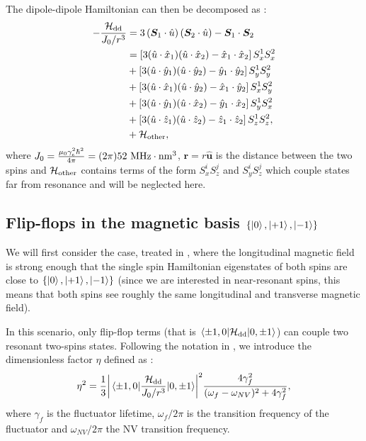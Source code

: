 \documentclass[preprintnumbers,amsmath,amssymb,onecolumn,12pt]{revtex4-2}\usepackage{graphicx}%
\begin{document}
The dipole-dipole Hamiltonian can then be decomposed as :
\begin{align}
-\frac{\mathcal{H}_{\rm dd}}{J_0/r^3}&= 3\left({\bm S}_1 \cdot \hat{u} \right)\left({\bm S}_2 \cdot \hat{u} \right) - {\bm S}_1 \cdot {\bm S}_2  \\
&=\left[3(\hat{u}\cdot\hat{x}_1)(\hat{u}\cdot\hat{x}_2) -\hat{x}_1\cdot\hat{x}_2\right] S_x^1S_x^2 \\
&+\left[3(\hat{u}\cdot\hat{y}_1)(\hat{u}\cdot\hat{y}_2) -\hat{y}_1\cdot\hat{y}_2\right] S_y^1S_y^2 \\
&+\left[3(\hat{u}\cdot\hat{x}_1)(\hat{u}\cdot\hat{y}_2) -\hat{x}_1\cdot\hat{y}_2\right] S_x^1S_y^2 \\
&+\left[3(\hat{u}\cdot\hat{y}_1)(\hat{u}\cdot\hat{x}_2) -\hat{y}_1\cdot\hat{x}_2\right] S_y^1S_x^2 \\
&+\left[3(\hat{u}\cdot\hat{z}_1)(\hat{u}\cdot\hat{z}_2) -\hat{z}_1\cdot\hat{z}_2\right] S_z^1S_z^2, \\
&+\mathcal{H}_{\rm other},
\end{align}
where $J_0=\frac{\mu_0 \gamma_e^2 \hbar^2}{4 \pi} = (2 \pi) 52\ \rm MHz \cdot \rm{nm}^3$, $\bm r= r\bm{\hat u}$ is the distance between the two spins and  $\mathcal{H}_{\rm other}$ contains terms of the form $S_x^iS_z^j$ and $S_y^iS_z^j$ which couple states far from resonance and will be neglected here.

\subsection{Flip-flops in the magnetic basis $\{ \ket{0},\ket{+1},\ket{-1} \} $}
We will first consider the case, treated in \cite{choi_depolarization_2017}, where the longitudinal magnetic field is strong enough that the single spin Hamiltonian eigenstates of both spins are close to $\{ \ket{0},\ket{+1},\ket{-1} \} $ (since we are interested in near-resonant spins, this means that both spins see roughly the same longitudinal and transverse magnetic field).

In this scenario, only flip-flop terms (that is $\mel{\pm 1,0}{\mathcal{H}_{\rm dd}}{0,\pm 1}$) can couple two resonant two-spins states. Following the notation in \cite{choi_depolarization_2017}, we introduce the dimensionless factor $\eta$ defined as : 
\begin{equation}
\eta^2=\frac{1}{3} \abs{\mel{\pm 1,0}{\frac{\mathcal{H}_{\rm dd}}{J_0/r^3}}{0,\pm 1}}^2  \frac{4\gamma_f^2}{(\omega_f - \omega_{NV})^2+4\gamma_f^2},
\end{equation}
where $\gamma_f$ is the fluctuator lifetime, $\omega_f/2\pi$ is the transition frequency of the fluctuator and $\omega_{NV}/2\pi$ the NV transition frequency. %
\end{document}
